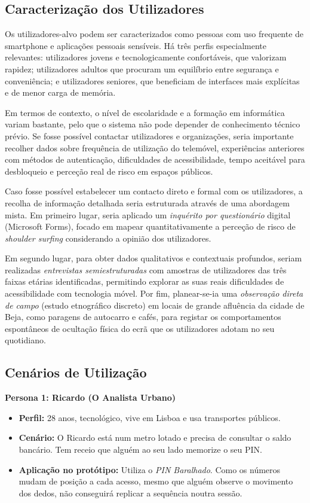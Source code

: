 \documentclass[a4paper]{article}
\begin{document}
\subsection{Caracterização dos Utilizadores}
Os utilizadores-alvo podem ser caracterizados como pessoas com uso frequente de smartphone e aplicações pessoais sensíveis. 
Há três perfis especialmente relevantes: utilizadores jovens e tecnologicamente confortáveis, que valorizam rapidez; utilizadores 
adultos que procuram um equilíbrio entre segurança e conveniência; e utilizadores seniores, que beneficiam de interfaces mais 
explícitas e de menor carga de memória.

Em termos de contexto, o nível de escolaridade e a formação em informática variam bastante, pelo que o sistema não pode depender 
de conhecimento técnico prévio. Se fosse possível contactar utilizadores e organizações, seria importante recolher dados sobre 
frequência de utilização do telemóvel, experiências anteriores com métodos de autenticação, dificuldades de acessibilidade, tempo 
aceitável para desbloqueio e perceção real de risco em espaços públicos.

Caso fosse possível estabelecer um contacto direto e formal com os utilizadores, a recolha de informação detalhada 
seria estruturada através de uma abordagem mista. Em primeiro lugar, seria aplicado um \textit{inquérito por questionário} 
digital (Microsoft Forms), focado em mapear quantitativamente a perceção de risco de \textit{shoulder surfing} considerando a 
opinião dos utilizadores.

Em segundo lugar, para obter dados qualitativos e contextuais profundos, seriam realizadas 
\textit{entrevistas semiestruturadas} com amostras de utilizadores das três faixas etárias 
identificadas, permitindo explorar as suas reais dificuldades de acessibilidade com tecnologia móvel. 
Por fim, planear-se-ia uma \textit{observação direta de campo} (estudo etnográfico discreto) em locais 
de grande afluência da cidade de Beja, como paragens de autocarro e cafés, para registar os comportamentos 
espontâneos de ocultação física do ecrã que os utilizadores adotam no seu quotidiano.

\newpage
\subsection{Cenários de Utilização}

\textbf{Persona 1: Ricardo (O Analista Urbano)}
\begin{itemize}
    \item \textbf{Perfil:} 28 anos, tecnológico, vive em Lisboa e usa transportes públicos.
    \item \textbf{Cenário:} O Ricardo está num metro lotado e precisa de consultar o saldo bancário. Tem receio que alguém ao seu lado memorize o seu PIN.
    \item \textbf{Aplicação no protótipo:} Utiliza o \textit{PIN Baralhado}. Como os números mudam de posição a cada acesso, mesmo 
    que alguém observe o movimento dos dedos, não conseguirá replicar a sequência noutra sessão.
\end{itemize}
\end{document}
